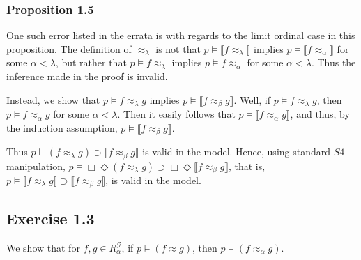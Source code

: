 \documentclass{article}
\newcommand{\lbc}{\llbracket}
\newcommand{\rbc}{\rrbracket}
\theoremstyle{definition}
\begin{document}
\subsubsection*{Proposition 1.5}
One such error listed in the errata is with regards to the limit ordinal case in this proposition. 
The definition of $\approx_\lambda$ is not that 
$p\vDash\lbc f\approx_\lambda\rbc$ implies 
$p\vDash\lbc f\approx_\alpha\rbc$ for some $\alpha<\lambda$,
but rather that $p\vDash f\approx_\lambda$ implies 
$p\vDash f\approx_\alpha$ for some $\alpha<\lambda$. Thus the inference made in the proof is invalid.

Instead, we show that $p\vDash f\approx_\lambda g$ implies 
$p\vDash \lbc f\approx_\beta g\rbc$. Well, if $p\vDash f\approx_\lambda g$, then 
$p\vDash f\approx_\alpha g$ for some $\alpha<\lambda$. Then it easily follows that 
$p\vDash \lbc f\approx_\alpha g\rbc$, and thus, by the induction assumption, 
$p\vDash \lbc f\approx_\beta g\rbc$.

Thus $p\vDash (f\approx_\lambda g)\supset\lbc f\approx_\beta g\rbc$ is valid in the model.
Hence, using standard $S4$ manipulation, 
$p\vDash\Box\Diamond(f\approx_\lambda g)\supset\Box\Diamond\lbc f\approx_\beta g\rbc$, that is, 
$p\vDash \lbc f\approx_\lambda g\rbc\supset\lbc f\approx_\beta g\rbc$, is valid in the model. 

\subsection*{Exercise 1.3}
We show that for $f,g\in R^\mathcal{G}_\alpha$, if $p\vDash (f\approx g)$, then 
$p\vDash (f\approx_\alpha g)$.
\end{document}
